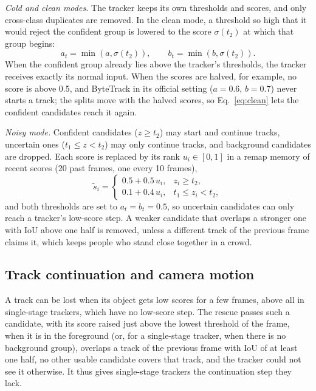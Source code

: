 \emph{Cold and clean modes.} The tracker keeps its own thresholds and scores, and only cross-class
duplicates are removed. In the clean mode, a threshold so high that it would reject the confident
group is lowered to the score $\sigma(t_2)$ at which that group begins:
\begin{equation}
a_t=\min\!\left(a,\sigma(t_2)\right),\qquad b_t=\min\!\left(b,\sigma(t_2)\right).
\label{eq:clean}
\end{equation}
When the confident group already lies above the tracker's thresholds, the tracker receives exactly
its normal input. When the scores are halved, for example, no score is above 0.5, and ByteTrack in
its official setting ($a=0.6$, $b=0.7$) never starts a track; the splits move with the halved
scores, so Eq.~\eqref{eq:clean} lets the confident candidates reach it again.

\emph{Noisy mode.} Confident candidates ($z\ge t_2$) may start and continue tracks, uncertain ones
($t_1\le z<t_2$) may only continue tracks, and background candidates are dropped. Each score is
replaced by its rank $u_i\in[0,1]$ in a remap memory of recent scores (20 past frames, one every 10
frames),
\begin{equation}
\tilde{s}_i=
\begin{cases}
0.5+0.5\,u_i, & z_i\ge t_2,\\
0.1+0.4\,u_i, & t_1\le z_i<t_2,
\end{cases}
\label{eq:remap}
\end{equation}
and both thresholds are set to $a_t=b_t=0.5$, so uncertain candidates can only reach a tracker's
low-score step. A weaker candidate that overlaps a stronger one with IoU above one half is removed,
unless a different track of the previous frame claims it, which keeps people who stand close
together in a crowd.

\subsection{Track continuation and camera motion}\label{sec:rescue}
A track can be lost when its object gets low scores for a few frames, above all in single-stage
trackers, which have no low-score step. The rescue passes such a candidate, with its score raised
just above the lowest threshold of the frame, when it is in the foreground (or, for a
single-stage tracker, when there is no background group), overlaps a track of the previous frame
with IoU of at least one half, no other usable candidate covers that track, and the tracker could
not see it otherwise. It thus gives single-stage trackers the continuation step they lack.

